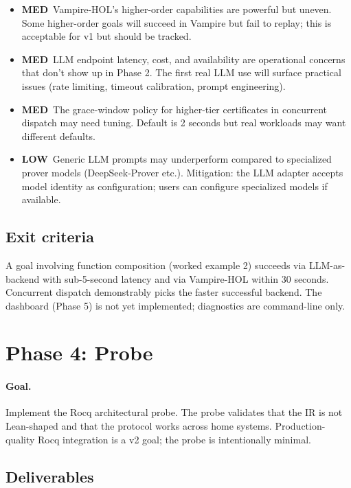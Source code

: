 \documentclass[11pt,letterpaper]{article}
\newcommand{\medrisk}{\textcolor{riskmed}{\textbf{MED}}}
\newcommand{\lowrisk}{\textcolor{risklow}{\textbf{LOW}}}
\begin{document}
\begin{itemize}
  \item \medrisk\ Vampire-HOL's higher-order capabilities are powerful
        but uneven. Some higher-order goals will succeed in Vampire
        but fail to replay; this is acceptable for v1 but should be
        tracked.
  \item \medrisk\ LLM endpoint latency, cost, and availability are
        operational concerns that don't show up in Phase 2. The first
        real LLM use will surface practical issues (rate limiting,
        timeout calibration, prompt engineering).
  \item \medrisk\ The grace-window policy for higher-tier certificates
        in concurrent dispatch may need tuning. Default is 2 seconds
        but real workloads may want different defaults.
  \item \lowrisk\ Generic LLM prompts may underperform compared to
        specialized prover models (DeepSeek-Prover etc.). Mitigation:
        the LLM adapter accepts model identity as configuration; users
        can configure specialized models if available.
\end{itemize}

\subsection{Exit criteria}

A goal involving function composition (worked example 2) succeeds via
LLM-as-backend with sub-5-second latency and via Vampire-HOL within
30 seconds. Concurrent dispatch demonstrably picks the faster
successful backend. The dashboard (Phase 5) is not yet implemented;
diagnostics are command-line only.

\section{Phase 4: Probe}
\label{sec:phase4}

\paragraph{Goal.} Implement the Rocq architectural probe. The probe
validates that the IR is not Lean-shaped and that the protocol works
across home systems. Production-quality Rocq integration is a v2
goal; the probe is intentionally minimal.

\subsection{Deliverables}
\end{document}
